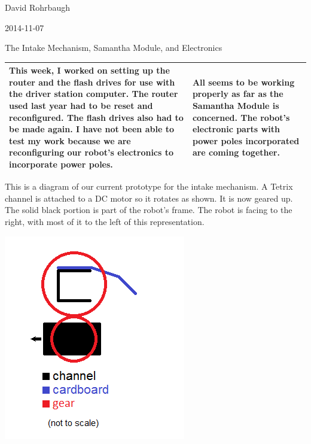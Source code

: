David Rohrbaugh

2014-11-07

The Intake Mechanism, Samantha Module, and Electronics

\begin{tabular}{|p{5cm}|p{5cm}|}
 \hline
 This week, I worked on setting up the router and the flash drives for use with the driver station computer. The router used last year had to be reset and reconfigured. The flash drives also had to be made again. I have not been able to test my work because we are reconfiguring our robot's electronics to incorporate power poles.
 &
 All seems to be working properly as far as the Samantha Module is concerned. The robot's electronic parts with power poles incorporated are coming together.
 \\
 \hline
\end{tabular}

\medskip

This is a diagram of our current prototype for the intake mechanism. A Tetrix channel is attached to a DC motor so it rotates as shown. It is now geared up. The solid black portion is part of the robot's frame. The robot is facing to the right, with most of it to the left of this representation.

\begin{center}
 \includegraphics{./Entries/Images/intakePrototype2.png}
\end{center}
